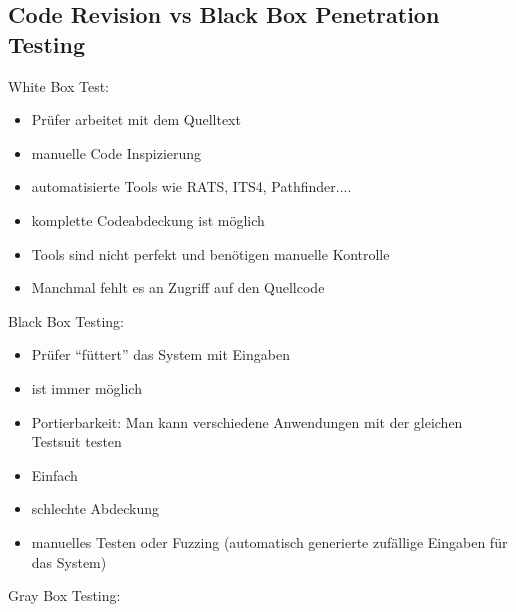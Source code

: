 \documentclass{article} %
\begin{document}
\subsection{Code Revision vs Black Box Penetration Testing}
White Box Test:
\begin{itemize}
	\item Prüfer arbeitet mit dem Quelltext
    \item manuelle Code Inspizierung
    \item automatisierte Tools wie RATS, ITS4, Pathfinder....
    \item komplette Codeabdeckung ist möglich
    \item Tools sind nicht perfekt und benötigen manuelle Kontrolle
    \item Manchmal fehlt es an Zugriff auf den Quellcode
\end{itemize}
Black Box Testing:
\begin{itemize}
	\item Prüfer "`füttert"' das System mit Eingaben
    \item ist immer möglich
    \item Portierbarkeit: Man kann verschiedene Anwendungen mit der gleichen Testsuit testen
    \item Einfach
    \item schlechte Abdeckung
    \item manuelles Testen oder Fuzzing (automatisch generierte zufällige Eingaben für das System)    
\end{itemize}
Gray Box Testing:
\end{document}
